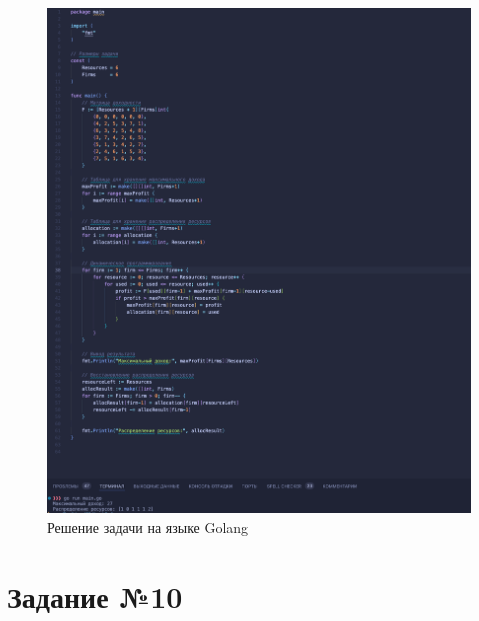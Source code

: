 \documentclass{article}
\begin{document}
\captionsetup{labelformat=empty}
\begin{figure}[h]
    \centering
    \includegraphics[width=\textwidth]{Go.png}
    \caption{Решение задачи на языке Golang}
\end{figure}

\section{Задание №10}
\end{document}
